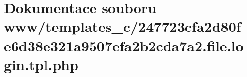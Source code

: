 \section{Dokumentace souboru www/templates\_\-c/247723cfa2d80fe6d38e321a9507efa2b2cda7a2.file.login.tpl.php}
\label{d4/d25/247723cfa2d80fe6d38e321a9507efa2b2cda7a2_8file_8login_8tpl_8php}
